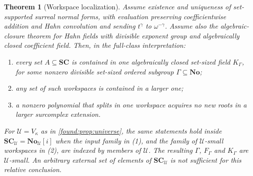 \documentclass[11pt,letterpaper]{article}
\numberwithin{equation}{section}
\newtheorem{theorem}{Theorem}[section]
\theoremstyle{definition}
\theoremstyle{remark}
\newcommand{\No}{\mathbf{No}}
\newcommand{\SC}{\mathbf{SC}}
\newcommand{\U}{\mathcal U}
\begin{document}
\begin{theorem}[Workspace localization]\label{found:thm:workspace}
Assume existence and uniqueness of set-supported surreal normal forms, with
evaluation preserving coefficientwise addition and Hahn convolution and sending
$t^\gamma$ to $\omega^{-\gamma}$. Assume also the algebraic-closure theorem
for Hahn fields with divisible exponent group and algebraically closed
coefficient field. Then, in the full-class interpretation:
\begin{enumerate}
\item every \emph{set} $A\subseteq\SC$ is contained in one algebraically closed
set-sized field $K_\Gamma$, for some nonzero divisible set-sized ordered
subgroup $\Gamma\subseteq\No$;
\item any set of such workspaces is contained in a larger one;
\item a nonzero polynomial that splits in one workspace acquires no new roots
in a larger surcomplex extension.
\end{enumerate}
For $\U=V_\kappa$ as in \cref{found:prop:universe}, the same statements hold
inside $\SC_\U=\No_\U[i]$ when the input family in (1), and the family of
$\U$-small workspaces in (2), are indexed by members of $\U$. The resulting
$\Gamma$, $F_\Gamma$ and $K_\Gamma$ are $\U$-small. An arbitrary external set
of elements of $\SC_\U$ is not sufficient for this relative conclusion.
\end{theorem}
\end{document}
